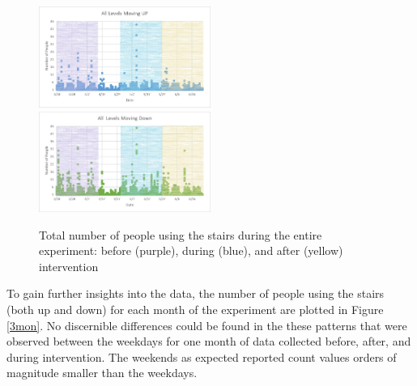 \begin{figure}[b]
    \includegraphics[width=0.5\textwidth]{image/up.png}%
    \includegraphics[width=0.5\textwidth]{image/down.png}
    \caption{Total number of people using the stairs during the entire experiment: before (purple), during (blue), and after (yellow) intervention}
    \label{updown}
\end{figure}




To gain further insights into the data, the number of people using the stairs (both up and down) for each month of the experiment are plotted in Figure \ref{3mon}. No discernible differences could be found in the these patterns that were observed between the weekdays for one month of data collected before, after, and during intervention. The weekends as expected reported count values orders of magnitude smaller than the weekdays.

